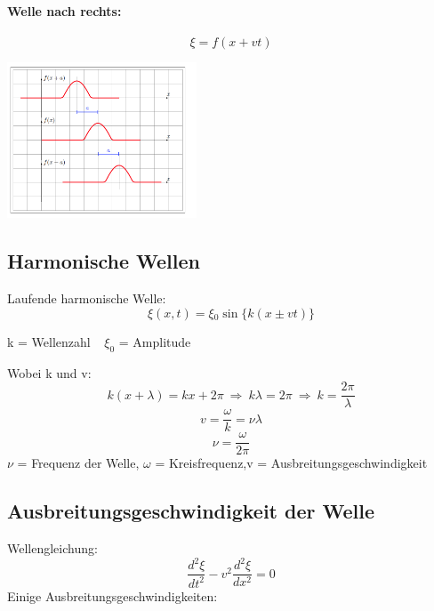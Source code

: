 \documentclass[7pt]{article}
\begin{document}
\begin{multicols*}{3}
\paragraph{Welle nach rechts:}
\begin{equation*}
\xi = f(x+vt) 
\end{equation*}
\begin{center}
	\includegraphics[width=160pt]{images/wellenrichtung.png}
\end{center}

\columnbreak


\subsection{Harmonische Wellen}
Laufende harmonische Welle:
\begin{equation*}
\xi(x,t) = \xi {_0} \sin\lbrace k(x\pm vt) \rbrace
\end{equation*}

k = Wellenzahl $\> \>$ 
$\xi_0$ = Amplitude\newline
\newline

Wobei k und v:
\begin{equation*}
k(x+\lambda) = kx + 2\pi \> \Longrightarrow  \> k\lambda = 2\pi \> \Longrightarrow \> k = \frac{2\pi}{\lambda}
\end{equation*}
\begin{equation*}
v = \frac{\omega}{k} = \nu\lambda
\end{equation*}
\begin{equation*}
\nu = \frac{\omega}{2\pi}
\end{equation*}
$\nu$ = Frequenz der Welle, $\omega$ = Kreisfrequenz,\newline v = Ausbreitungsgeschwindigkeit



\subsection{Ausbreitungsgeschwindigkeit der Welle}
Wellengleichung:
\begin{equation*}
\frac{d^2\xi}{dt^2} - v^2\frac{d^2\xi}{dx^2} = 0 
\end{equation*}
\newline
Einige Ausbreitungsgeschwindigkeiten:


\end{multicols*}
\end{document}
